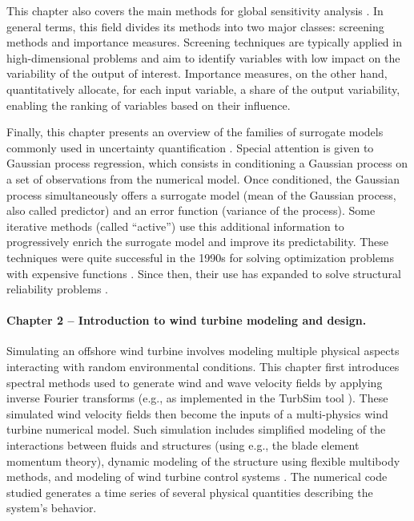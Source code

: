 This chapter also covers the main methods for global sensitivity analysis \citep{daveiga_iooss_2021}. 
In general terms, this field divides its methods into two major classes: screening methods and importance measures. 
Screening techniques are typically applied in high-dimensional problems and aim to identify variables with low impact on the variability of the output of interest. 
Importance measures, on the other hand, quantitatively allocate, for each input variable, a share of the output variability, enabling the ranking of variables based on their influence.

Finally, this chapter presents an overview of the families of surrogate models commonly used in uncertainty quantification \citep{forrester_2008}. 
Special attention is given to Gaussian process regression, which consists in conditioning a Gaussian process on a set of observations from the numerical model. 
Once conditioned, the Gaussian process simultaneously offers a surrogate model (mean of the Gaussian process, also called predictor) and an error function (variance of the process). 
Some iterative methods (called ``active'') use this additional information to progressively enrich the surrogate model and improve its predictability. 
These techniques were quite successful in the 1990s for solving optimization problems with expensive functions \citep{jones_1998}. 
Since then, their use has expanded to solve structural reliability problems \citep{echard_2011}.


\paragraph{Chapter 2 -- Introduction to wind turbine modeling and design.} 
Simulating an offshore wind turbine involves modeling multiple physical aspects interacting with random environmental conditions. 
This chapter first introduces spectral methods used to generate wind and wave velocity fields by applying inverse Fourier transforms (e.g., as implemented in the TurbSim tool \citealp{turbsim_2009}). 
These simulated wind velocity fields then become the inputs of a multi-physics wind turbine numerical model. 
Such simulation includes simplified modeling of the interactions between fluids and structures (using e.g., the blade element momentum theory), dynamic modeling of the structure using flexible multibody methods, and modeling of wind turbine control systems \citep{burton_2021_wind_handbook}. 
The numerical code studied generates a time series of several physical quantities describing the system's behavior.

